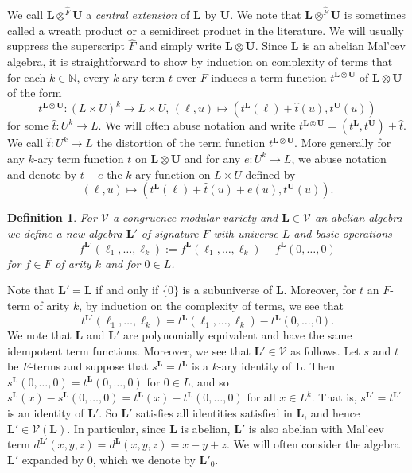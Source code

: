 \documentclass[10pt,a4paper]{amsart}
\numberwithin{equation}{section}
\newtheorem{definition}[theorem]{Definition}
\renewcommand{\L}{\mathbf{L}}
\newcommand{\N}{\mathbb{N}}
\newcommand{\U}{\mathbf{U}}
\newcommand{\V}{\mathcal{V}}
\begin{document}
We call $\L \otimes^{\hat{F}} \U$ a \emph{central extension} of $\L$ by $\U$. 
We note that $\L \otimes^{\hat{F}} \U$ is sometimes called a wreath product or a 
  semidirect product in the literature. 
We will usually suppress the superscript $\hat{F}$ and simply write $\L \otimes \U$. 
Since $\L$ is an abelian Mal'cev algebra, it is straightforward to show by induction on complexity of terms 
  that for each $k \in \N$, every $k$-ary term $t$ over $F$ induces a term function $t^{\L \otimes \U}$ of $\L \otimes \U$ of the form
  \[t^{\L \otimes \U} \colon (L \times U)^k \rightarrow L \times U, \, (\ell, u) \mapsto (t^\L(\ell) + \hat{t}(u), t^\U(u))\]
  for some $\hat{t}\colon U^k \rightarrow L$. 
We will often abuse notation and write $t^{\L \otimes \U} = (t^\L, t^\U) + \hat{t}$. 
We call $\hat{t} \colon U^k \rightarrow L$ the distortion of the term function $t^{\L \otimes \U}$. 
More generally for any $k$-ary term function $t$ on $\L \otimes \U$ and for any 
  $e \colon U^k \rightarrow L$, we abuse notation and denote by $t + e$ the $k$-ary 
  function on $L \times U$ defined by
  \[(\ell, u) \mapsto (t^\L(\ell)+\hat{t}(u) + e(u), t^\U(u)).\]
 
\begin{definition} \label{def:elprime} 
  For $\V$ a congruence modular variety and $\L \in \V$ an abelian algebra we define a new algebra $\L'$ 
    of signature $F$ with universe $L$ and basic operations 
    \[f^{\L'}(\ell_1, \ldots, \ell_k) := f^\L(\ell_1, \ldots, \ell_k) - f^\L(0, \ldots, 0)\]
    for $f \in F$ of arity $k$ and for $0 \in L$.
\end{definition}

Note that $\L' = \L$ if and only if $\{0\}$ is a subuniverse of $\L$. 
Moreover, for $t$ an $F$-term of arity $k$,  by induction on the complexity of terms, we see that 
  \[t^{\L'}(\ell_1, \ldots,\ell_k) = t^\L(\ell_1, \ldots, \ell_k) - t^\L(0, \ldots, 0).\] 
We note that $\L$ and $\L'$ are polynomially equivalent and have the same idempotent term functions. 
Moreover, we see that $\L' \in \V$ as follows.
Let $s$ and $t$ be $F$-terms and suppose that $s^\L = t^\L$ is a $k$-ary identity of $\L$.
Then $s^\L(0, \dots, 0) = t^\L(0, \dots, 0)$ for $0 \in L$,
  and so $s^\L(x) - s^\L(0, \dots, 0) = t^\L(x) - t^\L(0, \dots,0)$ for all $x \in L^k$. 
That is, $s^{\L'} = t^{\L'}$ is an identity of $\L'$.
So $\L'$ satisfies all identities satisfied in $\L$, and hence $\L' \in \V(\L)$. 
In particular, since $\L$ is abelian, $\L'$ is also abelian with Mal'cev term 
  $d^{\L'}(x,y,z) = d^\L(x,y,z) = x-y+z$.
We will often consider the algebra $\L'$ expanded by $0$, which we denote by $\L'_0$.
 
\end{document}
